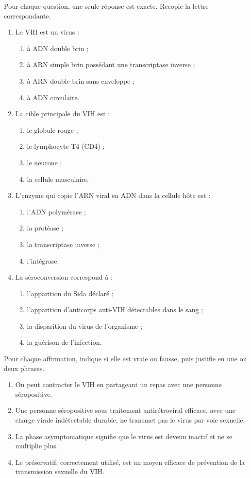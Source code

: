\documentclass[11pt]{article}
\begin{document}
\begin{exercice}
Pour chaque question, une seule réponse est exacte. Recopie la lettre correspondante.
\begin{enumerate}
\item Le VIH est un virus :
\begin{enumerate}
\item à ADN double brin ;
\item à ARN simple brin possédant une transcriptase inverse ;
\item à ARN double brin sans enveloppe ;
\item à ADN circulaire.
\end{enumerate}
\item La cible principale du VIH est :
\begin{enumerate}
\item le globule rouge ;
\item le lymphocyte T4 (CD4) ;
\item le neurone ;
\item la cellule musculaire.
\end{enumerate}
\item L'enzyme qui copie l'ARN viral en ADN dans la cellule hôte est :
\begin{enumerate}
\item l'ADN polymérase ;
\item la protéase ;
\item la transcriptase inverse ;
\item l'intégrase.
\end{enumerate}
\item La séroconversion correspond à :
\begin{enumerate}
\item l'apparition du Sida déclaré ;
\item l'apparition d'anticorps anti-VIH détectables dans le sang ;
\item la disparition du virus de l'organisme ;
\item la guérison de l'infection.
\end{enumerate}
\end{enumerate}
\end{exercice}

\begin{exercice}
Pour chaque affirmation, indique si elle est vraie ou fausse, puis justifie en une ou deux phrases.
\begin{enumerate}
\item On peut contracter le VIH en partageant un repas avec une personne séropositive.
\item Une personne séropositive sous traitement antirétroviral efficace, avec une charge virale indétectable durable, ne transmet pas le virus par voie sexuelle.
\item La phase asymptomatique signifie que le virus est devenu inactif et ne se multiplie plus.
\item Le préservatif, correctement utilisé, est un moyen efficace de prévention de la transmission sexuelle du VIH.
\end{enumerate}
\end{exercice}
\end{document}

